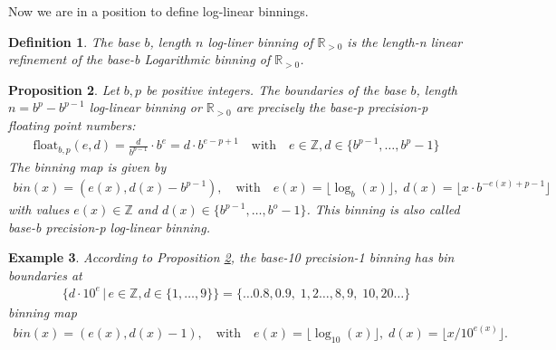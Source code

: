 \documentclass{article}
\theoremstyle{plain}
\newtheorem{definition}{Definition}[section]
\newtheorem{proposition}[definition]{Proposition}
\newtheorem{example}[definition]{Example}
\theoremstyle{remark}
\newcommand{\IR}{\mathbb{R}}
\newcommand{\IZ}{\mathbb{Z}}
\newcommand{\qtext}[1]{\quad\text{#1}\quad} %
\newcommand{\floor}[1]{\lfloor#1\rfloor}
\newcommand{\float}{\mathrm{float}}
\begin{document}
Now we are in a position to define log-linear binnings.

\begin{definition}\label{def:ll}
  The base $b$, length $n$ log-liner binning of $\IR_{>0}$ is the length-n linear refinement of the base-b Logarithmic binning of $\IR_{>0}$.
\end{definition}

\begin{proposition}\label{prop:ll}
  Let $b,p$ be positive integers. The boundaries of the base $b$, length $n = b^p - b^{p-1}$ log-linear
  binning or $\IR_{>0}$ are precisely the base-p precision-p floating point numbers:
  \begin{align*}
    \float_{b,p}(e, d) = \frac{d}{b^{p-1}} \cdot b^e = d \cdot b^{e-p+1} \qtext{with} e \in \IZ, d \in \{ b^{p-1}, \dots, b^p - 1 \}
  \end{align*}
  The binning map is given by
  \begin{align*}
    bin(x) = (e(x), d(x) - b^{p-1}), \qtext{with} e(x) = \floor{\log_b(x)},\; d(x) = \floor{x \cdot b^{-e(x) + p - 1}}
  \end{align*}
  with values $e(x) \in \IZ$ and $d(x) \in \{b^{p-1}, \dots, b^{o} - 1\}$.
  This binning is also called base-b precision-p log-linear binning.
\end{proposition}

\begin{example}
  According to Proposition \ref{prop:ll}, the base-10 precision-1 binning has bin boundaries at
  \begin{align*}
      \{ d \cdot 10^e  \,|\, e \in \IZ, d \in \{ 1, \dots, 9 \} \} = \{ \dots 0.8, 0.9,\; 1, 2 \dots, 8, 9,\; 10, 20 \dots \}
  \end{align*}
  binning map
  \begin{align*}
    bin(x) = (e(x), d(x) - 1), \qtext{with} e(x) = \floor{\log_{10}(x)},\; d(x) = \floor{x / 10^{e(x)}}.
  \end{align*}
\end{example}
\end{document}
